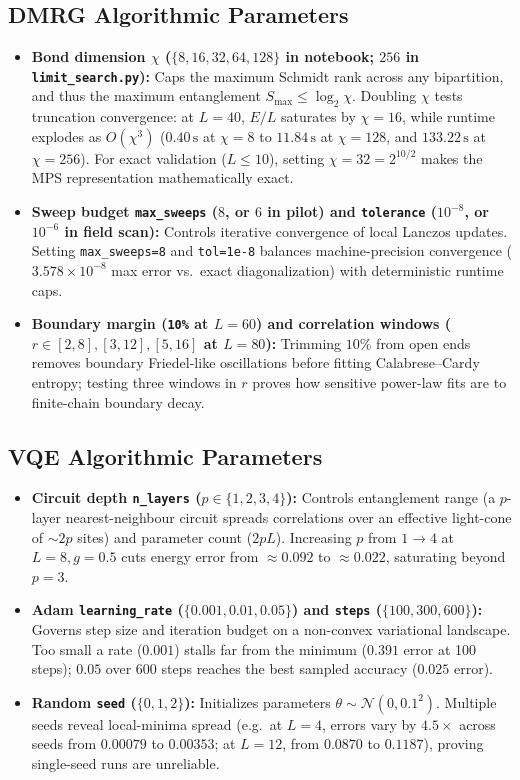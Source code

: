 \documentclass[11pt,a4paper]{article}
\begin{document}
\subsection{DMRG Algorithmic Parameters}
\begin{itemize}[leftmargin=*]
\item \textbf{Bond dimension $\chi$ ($\{8, 16, 32, 64, 128\}$ in notebook; $256$ in \texttt{limit\_search.py}):} Caps the maximum Schmidt rank across any bipartition, and thus the maximum entanglement $S_{\max} \le \log_2 \chi$. Doubling $\chi$ tests truncation convergence: at $L=40$, $E/L$ saturates by $\chi=16$, while runtime explodes as $O(\chi^3)$ ($0.40\,\mathrm{s}$ at $\chi=8$ to $11.84\,\mathrm{s}$ at $\chi=128$, and $133.22\,\mathrm{s}$ at $\chi=256$). For exact validation ($L \le 10$), setting $\chi=32 = 2^{10/2}$ makes the MPS representation mathematically exact.
\item \textbf{Sweep budget \texttt{max\_sweeps} ($8$, or $6$ in pilot) and \texttt{tolerance} ($10^{-8}$, or $10^{-6}$ in field scan):} Controls iterative convergence of local Lanczos updates. Setting \texttt{max\_sweeps=8} and \texttt{tol=1e-8} balances machine-precision convergence ($3.578\times 10^{-8}$ max error vs.\ exact diagonalization) with deterministic runtime caps.
\item \textbf{Boundary margin (\texttt{10\%} at $L=60$) and correlation windows ($r \in [2,8], [3,12], [5,16]$ at $L=80$):} Trimming $10\%$ from open ends removes boundary Friedel-like oscillations before fitting Calabrese--Cardy entropy; testing three windows in $r$ proves how sensitive power-law fits are to finite-chain boundary decay.
\end{itemize}

\subsection{VQE Algorithmic Parameters}
\begin{itemize}[leftmargin=*]
\item \textbf{Circuit depth \texttt{n\_layers} ($p \in \{1, 2, 3, 4\}$):} Controls entanglement range (a $p$-layer nearest-neighbour circuit spreads correlations over an effective light-cone of $\sim 2p$ sites) and parameter count ($2pL$). Increasing $p$ from $1 \to 4$ at $L=8, g=0.5$ cuts energy error from $\approx 0.092$ to $\approx 0.022$, saturating beyond $p=3$.
\item \textbf{Adam \texttt{learning\_rate} ($\{0.001, 0.01, 0.05\}$) and \texttt{steps} ($\{100, 300, 600\}$):} Governs step size and iteration budget on a non-convex variational landscape. Too small a rate ($0.001$) stalls far from the minimum ($0.391$ error at 100 steps); $0.05$ over 600 steps reaches the best sampled accuracy ($0.025$ error).
\item \textbf{Random \texttt{seed} ($\{0, 1, 2\}$):} Initializes parameters $\theta \sim \mathcal{N}(0, 0.1^2)$. Multiple seeds reveal local-minima spread (e.g.\ at $L=4$, errors vary by $4.5\times$ across seeds from $0.00079$ to $0.00353$; at $L=12$, from $0.0870$ to $0.1187$), proving single-seed runs are unreliable.
\end{itemize}
\end{document}
